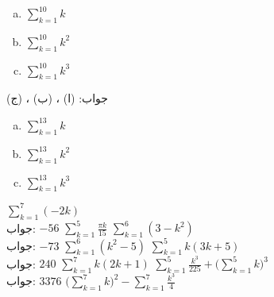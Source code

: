 \begin{multicols}{3}
\begin{enumerate}[a.]
\item
$\sum\limits_{k=1}^{10} k$
\item
$\sum\limits_{k=1}^{10}k^2$
\item
$\sum\limits_{k=1}^{10}k^3$
\end{enumerate}
\end{multicols}
جواب:\quad
(ا) ، (ب) ، (ج) 
\begin{multicols}{3}
\begin{enumerate}[a.]
\item
$\sum\limits_{k=1}^{13} k$
\item
$\sum\limits_{k=1}^{13}k^2$
\item
$\sum\limits_{k=1}^{13}k^3$
\end{enumerate}
\end{multicols}
$\sum\limits_{k=1}^7 (-2k)$\\
جواب:\quad
$-56$
$\sum\limits_{k=1}^5 \tfrac{\pi k}{15}$
$\sum\limits_{k=1}^6 (3-k^2)$\\
جواب:\quad
$-73$
$\sum\limits_{k=1}^6 (k^2-5)$
$\sum\limits_{k=1}^5 k(3k+5)$\\
جواب:\quad
$240$
$\sum\limits_{k=1}^7 k(2k+1)$
$\sum\limits_{k=1}^5 \tfrac{k^3}{225}+\big(\sum\limits_{k=1}^5 k\big)^3$\\
جواب:\quad
$3376$
$\big(\sum\limits_{k=1}^7 k\big)^2-\sum\limits_{k=1}^7 \tfrac{k^3}{4}$

